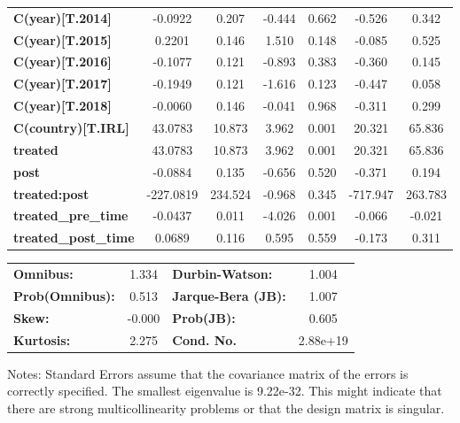 \begin{center}
\begin{tabular}{lcccccc}
\textbf{C(year)[T.2014]}     &      -0.0922  &        0.207     &    -0.444  &         0.662        &       -0.526    &        0.342     \\
\textbf{C(year)[T.2015]}     &       0.2201  &        0.146     &     1.510  &         0.148        &       -0.085    &        0.525     \\
\textbf{C(year)[T.2016]}     &      -0.1077  &        0.121     &    -0.893  &         0.383        &       -0.360    &        0.145     \\
\textbf{C(year)[T.2017]}     &      -0.1949  &        0.121     &    -1.616  &         0.123        &       -0.447    &        0.058     \\
\textbf{C(year)[T.2018]}     &      -0.0060  &        0.146     &    -0.041  &         0.968        &       -0.311    &        0.299     \\
\textbf{C(country)[T.IRL]}   &      43.0783  &       10.873     &     3.962  &         0.001        &       20.321    &       65.836     \\
\textbf{treated}             &      43.0783  &       10.873     &     3.962  &         0.001        &       20.321    &       65.836     \\
\textbf{post}                &      -0.0884  &        0.135     &    -0.656  &         0.520        &       -0.371    &        0.194     \\
\textbf{treated:post}        &    -227.0819  &      234.524     &    -0.968  &         0.345        &     -717.947    &      263.783     \\
\textbf{treated\_pre\_time}  &      -0.0437  &        0.011     &    -4.026  &         0.001        &       -0.066    &       -0.021     \\
\textbf{treated\_post\_time} &       0.0689  &        0.116     &     0.595  &         0.559        &       -0.173    &        0.311     \\
\bottomrule
\end{tabular}
\begin{tabular}{lclc}
\textbf{Omnibus:}       &  1.334 & \textbf{  Durbin-Watson:     } &    1.004  \\
\textbf{Prob(Omnibus):} &  0.513 & \textbf{  Jarque-Bera (JB):  } &    1.007  \\
\textbf{Skew:}          & -0.000 & \textbf{  Prob(JB):          } &    0.605  \\
\textbf{Kurtosis:}      &  2.275 & \textbf{  Cond. No.          } & 2.88e+19  \\
\bottomrule
\end{tabular}
\end{center}

Notes: \newline
 [1] Standard Errors assume that the covariance matrix of the errors is correctly specified. \newline
 [2] The smallest eigenvalue is 9.22e-32. This might indicate that there are \newline
 strong multicollinearity problems or that the design matrix is singular.
